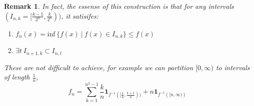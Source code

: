 \documentclass[UTF8, 12pt]{article}
\newtheorem*{remark*}{Remark}
\begin{document}
    \begin{remark*}
        In fact, the essense of this construction is that for any intervals $(I_{n,k} = [\frac{k-1}{2^n}, \frac{k}{2^n}))$, it satisifes:
        \begin{enumerate}
            \item  
                $
                f_n(x) = \text{inf}\ \{f(x)\ |\ f(x) \in I_{n,k}\} \leq f(x)
                $
            \item $\exists t\ I_{n+1,k} \subset I_{n,t}$
        \end{enumerate}
        These are not difficult to achieve, for example we can partition $[0,\infty)$ to intervals of length $\frac{1}{n}$, 
        $$
            f_n = \sum_{k=1}^{n^2-1} \frac{k}{n}\textbf{1}_{f^{-1}([\frac{k}{n}, \frac{k + 1}{n}))} + n\textbf{1}_{f^{-1}({[n,\infty)})}
        $$
    \end{remark*}
\end{document}
